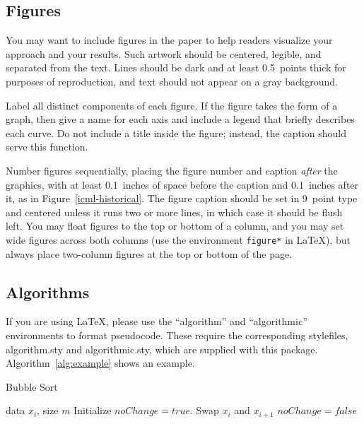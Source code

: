 \documentclass{article}
\begin{document}
\subsection{Figures}
 
You may want to include figures in the paper to help readers visualize
your approach and your results. Such artwork should be centered,
legible, and separated from the text. Lines should be dark and at
least 0.5~points thick for purposes of reproduction, and text should
not appear on a gray background.

Label all distinct components of each figure. If the figure takes the
form of a graph, then give a name for each axis and include a legend
that briefly describes each curve. Do not include a title inside the
figure; instead, the caption should serve this function.

Number figures sequentially, placing the figure number and caption
{\it after\/} the graphics, with at least 0.1~inches of space before
the caption and 0.1~inches after it, as in
Figure~\ref{icml-historical}.  The figure caption should be set in
9~point type and centered unless it runs two or more lines, in which
case it should be flush left.  You may float figures to the top or
bottom of a column, and you may set wide figures across both columns
(use the environment {\tt figure*} in \LaTeX), but always place
two-column figures at the top or bottom of the page.

\subsection{Algorithms}

If you are using \LaTeX, please use the ``algorithm'' and ``algorithmic'' 
environments to format pseudocode. These require 
the corresponding stylefiles, algorithm.sty and 
algorithmic.sty, which are supplied with this package. 
Algorithm~\ref{alg:example} shows an example. 

\begin{algorithm}[tb]
   \caption{Bubble Sort}
   \label{alg:example}
\begin{algorithmic}
    data $x_i$, size $m$
   \REPEAT
   \STATE Initialize $noChange = true$.
   \STATE Swap $x_i$ and $x_{i+1}$
   \STATE $noChange = false$
   \ENDIF
   \ENDFOR
\end{algorithmic}
\end{algorithm}
 
\end{document}
